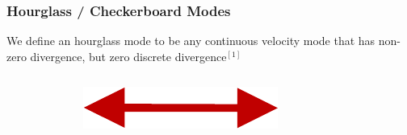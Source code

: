 \documentclass[8pt,xcolor=svgnames]{beamer}
\begin{document}
\begin{frame}
 \frametitle{Hourglass / Checkerboard Modes}
\bigskip
We define an hourglass mode to be any continuous velocity mode that
has non-zero divergence, but zero discrete divergence$^{[1]}$
\bigskip

\begin{columns}
 \begin{column}{0.6\textwidth}
\begin{columns}
\begin{column}{0.3\textwidth}
\begin{center}
\end{center}
\end{column}
\begin{column}{0.2\textwidth}
\begin{center}
 \includegraphics[width=.5in,keepaspectratio=true]{./Images/redLRarrow.png}
\end{center}
\end{column}
\begin{column}{0.3\textwidth}
\begin{center}
\end{center} 
\end{column}
\end{columns}
\end{column}
\end{columns}


\end{frame}
\end{document}
